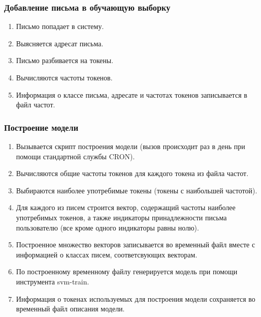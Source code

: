 \subsubsection{Добавление письма в обучающую выборку}

\begin{enumerate}
    \item Письмо попадает в систему.
    \item Выясняется адресат письма.
    \item Письмо разбивается на токены.
    \item Вычисляются частоты токенов.
    \item Информация о классе письма, адресате и частотах токенов записывается в файл частот.
\end{enumerate}

\subsubsection{Построение модели}
\begin{enumerate}
    \item Вызывается скрипт построения модели (вызов происходит раз в день при помощи стандартной службы CRON).
    \item Вычисляются общие частоты токенов для каждого токена из файла частот.
    \item Выбираются наиболее употребимые токены (токены с наибольшей частотой).
    \item Для каждого из писем строится вектор, содержащий частоты наиболее употребимых токенов, а также индикаторы принадлежности письма пользователю (все кроме одного индикаторы равны нолю).
    \item Построенное множество векторов записывается во временный файл вместе с информацией о классах писем,  соответсвующих векторам.
    \item По построенному временному файлу генерируется модель при помощи инструмента svm-train.
    \item Информация о токенах используемых для построения модели сохраняется во временный файл описания модели.
\end{enumerate}

